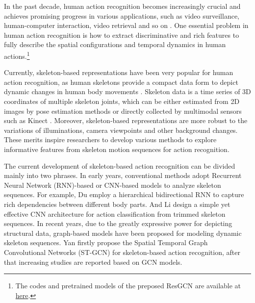 \documentclass[sigconf]{acmart}
\begin{document}
In the past decade, human action recognition becomes increasingly crucial and achieves promising progress in various applications, such as video surveillance, human-computer interaction, video retrieval and so on \cite{poppe2010survey, aggarwal2011human, weinland2011survey}. One essential problem in human action recognition is how to extract discriminative and rich features to fully describe the spatial configurations and temporal dynamics in human actions.\footnote{The codes and pretrained models of the preposed ResGCN are available at \href{http://github.com/yfsong0709/ResGCNv1}{here}.}

Currently, skeleton-based representations have been very popular for human action recognition, as human skeletons provide a compact data form to depict dynamic changes in human body movements \cite{johansson1973visual}. Skeleton data is a time series of 3D coordinates of multiple skeleton joints, which can be either estimated from 2D images by pose estimation methods \cite{cao2017realtime} or directly collected by multimodal sensors such as Kinect \cite{zhang2012microsoft}. Moreover, skeleton-based representations are more robust to the variations of illuminations, camera viewpoints and other background changes. These merits inspire researchers to develop various methods to explore informative features from skeleton motion sequences for action recognition.

The current development of skeleton-based action recognition can be divided mainly into two phrases. In early years, conventional methods adopt Recurrent Neural Network (RNN)-based or CNN-based models to analyze skeleton sequences. For example, Du \etal \cite{du2015hierarchical} employ a hierarchical bidirectional RNN to capture rich dependencies between different body parts. And Li \etal \cite{li2017skeleton} design a simple yet effective CNN architecture for action classification from trimmed skeleton sequences. In recent years, due to the greatly expressive power for depicting structural data, graph-based models \cite{kipf2016semi, li2018adaptive} have been proposed for modeling dynamic skeleton sequences. Yan \etal \cite{yan2018spatial} firstly propose the Spatial Temporal Graph Convolutional Networks (ST-GCN) for skeleton-based action recognition, after that increasing studies \cite{zhang2019graph, shi2019two, song2019richly} are reported based on GCN models.
\end{document}
